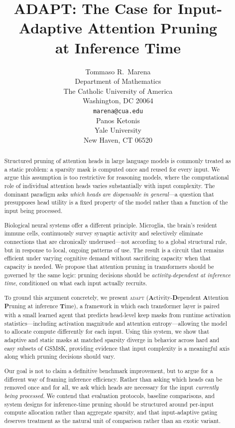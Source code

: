 \documentclass{article}
\title{ADAPT: The Case for Input-Adaptive Attention Pruning\\
       at Inference Time}
\author{%
  Tommaso R.\ Marena \\
  Department of Mathematics \\
  The Catholic University of America \\
  Washington, DC 20064 \\
  \texttt{marena@cua.edu} \\
  \And
  Panos Ketonis \\
  Yale University \\
  New Haven, CT 06520
}
\newcommand{\system}{\textsc{adapt}}
\begin{document}
\maketitle

\begin{abstract}
Structured pruning of attention heads in large language models is commonly treated as a
static problem: a sparsity mask is computed once and reused for every input. We argue this
assumption is too restrictive for reasoning models, where the computational role of individual
attention heads varies substantially with input complexity. The dominant paradigm asks
\emph{which heads are dispensable in general}---a question that presupposes head utility is a
fixed property of the model rather than a function of the input being processed.

Biological neural systems offer a different principle. Microglia, the brain's resident immune
cells, continuously survey synaptic activity and selectively eliminate connections that are
chronically underused---not according to a global structural rule, but in response to local,
ongoing patterns of use. The result is a circuit that remains efficient under varying cognitive
demand without sacrificing capacity when that capacity is needed. We propose that attention
pruning in transformers should be governed by the same logic: pruning decisions should be
\emph{activity-dependent at inference time}, conditioned on what each input actually recruits.

To ground this argument concretely, we present \system{}
(\textbf{A}ctivity-\textbf{D}ependent \textbf{A}ttention \textbf{P}runing at inference
\textbf{T}ime), a framework in which each transformer layer is paired with a small learned
agent that predicts head-level keep masks from runtime activation statistics---including
activation magnitude and attention entropy---allowing the model to allocate compute
differently for each input. Using this system, we show that adaptive and static masks at
matched sparsity diverge in behavior across hard and easy subsets of GSM8K, providing
evidence that input complexity is a meaningful axis along which pruning decisions should vary.

Our goal is not to claim a definitive benchmark improvement, but to argue for a different way
of framing inference efficiency. Rather than asking which heads can be removed once and for
all, we ask which heads are necessary for the input \emph{currently being processed}. We
contend that evaluation protocols, baseline comparisons, and system designs for
inference-time pruning should be structured around per-input compute allocation rather than
aggregate sparsity, and that input-adaptive gating deserves treatment as the natural unit of
comparison rather than an exotic variant.
\end{abstract}
\end{document}
